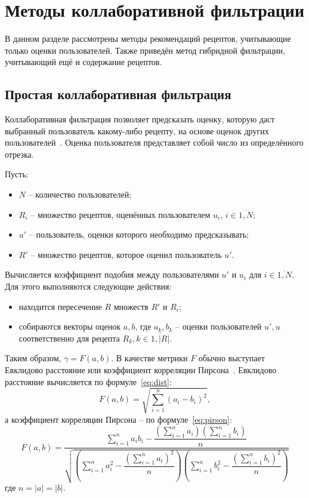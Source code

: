 \section{Методы коллаборативной фильтрации}

В данном разделе рассмотрены методы рекомендаций рецептов, учитывающие только оценки пользователей.
Также приведён метод гибридной фильтрации, учитывающий ещё и содержание рецептов.

\subsection{Простая коллаборативная фильтрация}
Коллаборативная фильтрация позволяет предсказать оценку, которую даст выбранный пользователь какому-либо рецепту, на основе оценок других пользователей~\cite{segaran}.
Оценка пользователя представляет собой число из определённого отрезка.

Пусть:
\begin{itemize}
    \item $N$ -- количество пользователей;
    \item $R_i$ -- множество рецептов, оценённых пользователем $u_i$, $i \in \overline{1, N}$;
    \item $u'$ -- пользователь, оценки которого необходимо предсказывать;
    \item $R'$ -- множество рецептов, которое оценил пользователь $u'$.
\end{itemize}

Вычисляется коэффициент подобия между пользователями $u'$ и $u_i$ для $i \in \overline{1, N}$.
Для этого выполняются следующие действия:
\begin{itemize}
    \item находится пересечение $R$ множеств $R'$ и $R_i$;
    \item собираются векторы оценок $a, b$, где $a_k, b_k$ -- оценки пользователей $u', u$ соответственно для рецепта $R_k, k \in \overline{1, |R|}$.
\end{itemize}
Таким образом, $\gamma = F(a, b)$.
В качестве метрики $F$ обычно выступает Евклидово расстояние или коэффициент корреляции Пирсона~\cite{segaran}.
Евклидово расстояние вычисляется по формуле~\eqref{eq:dist}:
\begin{equation}
    F(a, b) = \sqrt{\sum\limits_{i=1}^{n} (a_i - b_i)^2},
    \label{eq:dist}
\end{equation}
а коэффициент корреляции Пирсона -- по формуле~\eqref{eq:pirson}:
\begin{equation}
\label{eq:pirson}
    F(a, b) = \dfrac{\sum\limits_{i=1}^{n} a_i b_i - \dfrac{\left(\sum\limits_{i=1}^{n} a_i\right) \left(\sum\limits_{i=1}^{n} b_i\right)}{n}}{\sqrt{\left(\sum\limits_{i=1}^{n} a_i^2 - \dfrac{\left(\sum\limits_{i=1}^{n} a_i\right)^2}{n}\right) \left(\sum\limits_{i=1}^{n} b_i^2 - \dfrac{\left(\sum\limits_{i=1}^{n} b_i\right)^2}{n}\right)}}
\end{equation}
где $n = |a| = |b|$.

